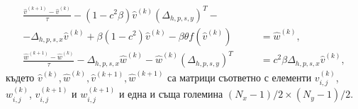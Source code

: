 \documentclass{article}
\theoremstyle{remark}
\begin{document}
\begin{equation}\label{eq555}
\begin{split}
\frac {\widehat{v}^{(k+1)}-\widehat{v}^{(k)}}{\tau}- (1-c^2 \beta) \widehat{v}^{(k)}  (\Delta_{h,p,s,y})^T - \quad\quad\quad\;&\\
-\Delta_{h,p,s,x}  \widehat{v}^{(k)}+ \beta (1-c^2 ) \widehat{v}^{(k)} - \beta \theta f(\widehat{v}^{(k)}) &= \widehat{w}^{(k)}, \\
\frac  {\widehat{w}^{(k+1)} -\widehat{w}^{(k)}} {\tau} - \Delta_{h,p,s,x}  \widehat{w}^{(k)} - \widehat{w}^{(k)}  (\Delta_{h,p,s,y})^T &=  c^2 \beta \Delta_{h,p,s,x}  \widehat{v}^{(k)},
\end{split}
\end{equation}
където $\widehat{v}^{(k)}, \widehat{w}^{(k)}, \widehat{v}^{(k+1)}, \widehat{w}^{(k+1)}$ са матрици съответно с елементи ${v}_{i,j}^{(k)}$, ${w}_{i,j}^{(k)}$, ${v}_{i,j}^{(k+1)}$ и ${w}_{i,j}^{(k+1)}$ и една и съща големина $(N_x-1)/2 \times (N_y-1)/2$.
\end{document}
